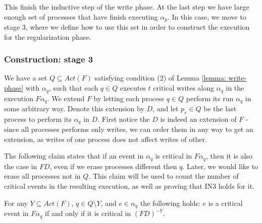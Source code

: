 This finish the inductive step of the write phase. At the last step we have large enough set of processes that have finish executing $\alpha_p$. In this case, we move to stage 3, where we define how to use this set in order to construct the execution for the regularization phase.



\subsubsection{Construction: stage 3}

We have a set $Q \subseteq Act(F)$ satisfying condition (2) of Lemma \ref{lemma: write-phase} with $\alpha_q$, such that each $q \in Q$ executes $t$ critical writes along $\alpha_q$ in the execution $F \alpha_q$.
We extend $F$ by letting each process $q \in Q$ perform its run $\alpha_q$ in some arbitrary way. Denote this extension by $D$, and let $p_r \in Q$ be the last process to perform its $\alpha_q$ in $D$. First notice the $D$ is indeed an extension of $F$ - since all processes performs only writes, we can order them in any way to get an extension, as writes of one process does not affect writes of other.

The following claim states that if an event in $\alpha_q$ is critical in $F \alpha_q$, then it is also the case in $F D$, even if we erase processes different then $q$. Later, we would like to erase all processes not in $Q$. This claim will be used to count the number of critical events in the resulting execution, as well as proving that IN3 holds for it.

\begin{claim-subsection} \label{claim: IN3-write-phase}
	For any $Y \subseteq Act(F)$, $q \in Q \setminus Y$, and $e \in \alpha_q$ the following holds:
	$e$ is a critical event in $F \alpha_q$ if and only if it is critical in $(F D)^{-Y}$.
\end{claim-subsection}

